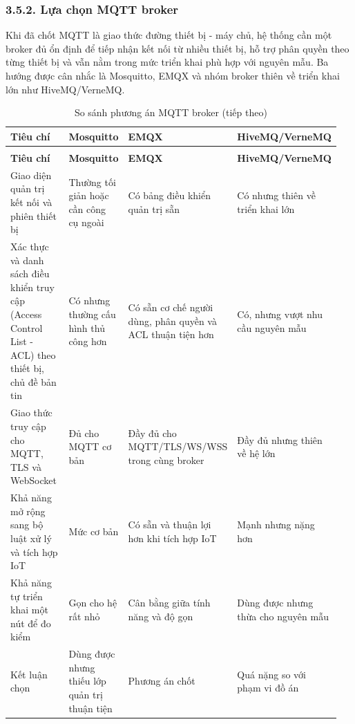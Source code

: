 \documentclass[a4paper]{extarticle}
\newcommand{\thesissettableid}[2]{%
  \renewcommand{\thetable}{#1}%
  \renewcommand{\theHtable}{#2}%
}
\begin{document}
\subsubsection{3.5.2. Lựa chọn MQTT broker}\label{lux1ef1a-chux1ecdn-mqtt-broker}

Khi đã chốt MQTT là giao thức đường thiết bị - máy chủ, hệ thống cần một broker
đủ ổn định để tiếp nhận kết nối từ nhiều thiết bị, hỗ trợ phân quyền theo từng
thiết bị và vẫn nằm trong mức triển khai phù hợp với nguyên mẫu. Ba hướng được
cân nhắc là Mosquitto, EMQX và nhóm broker thiên về triển khai lớn như
HiveMQ/VerneMQ.

{\thesissettableid{3.23}{condensed-bang-3-23-so-sanh-phuong-an-mqtt-broker}
\def\LTcaptype{table}
\begin{longtable}{|L{0.360\linewidth}|L{0.180\linewidth}|L{0.240\linewidth}|L{0.170\linewidth}|}
\caption{So sánh phương án MQTT broker}\label{tab:condensed-bang-3-23-so-sanh-phuong-an-mqtt-broker}\\
\hline
\textbf{Tiêu chí} & \textbf{Mosquitto} & \textbf{EMQX} & \textbf{HiveMQ/}\newline\textbf{VerneMQ} \\
\hline
\endfirsthead
\caption[]{So sánh phương án MQTT broker (tiếp theo)}\\
\hline
\textbf{Tiêu chí} & \textbf{Mosquitto} & \textbf{EMQX} & \textbf{HiveMQ/}\newline\textbf{VerneMQ} \\
\hline
\endhead
\endfoot
\endlastfoot
Giao diện quản trị kết nối và phiên thiết bị & Thường tối giản hoặc cần công cụ ngoài & Có bảng điều khiển quản trị sẵn & Có nhưng thiên về triển khai lớn \\\hline
Xác thực và danh sách điều khiển truy cập (Access Control List - ACL) theo thiết bị, chủ đề bản tin & Có nhưng thường cấu hình thủ công hơn & Có sẵn cơ chế người dùng, phân quyền và ACL thuận tiện hơn & Có, nhưng vượt nhu cầu nguyên mẫu \\\hline
Giao thức truy cập cho MQTT, TLS và WebSocket & Đủ cho MQTT cơ bản & Đầy đủ cho MQTT/TLS/\newline WS/WSS trong cùng broker & Đầy đủ nhưng thiên về hệ lớn \\\hline
Khả năng mở rộng sang bộ luật xử lý và tích hợp IoT & Mức cơ bản & Có sẵn và thuận lợi hơn khi tích hợp IoT & Mạnh nhưng nặng hơn \\\hline
Khả năng tự triển khai một nút để đo kiểm & Gọn cho hệ rất nhỏ & Cân bằng giữa tính năng và độ gọn & Dùng được nhưng thừa cho nguyên mẫu \\\hline
Kết luận chọn & Dùng được nhưng thiếu lớp quản trị thuận tiện & Phương án chốt & Quá nặng so với phạm vi đồ án \\\hline
\end{longtable}
}
\end{document}
